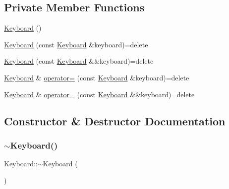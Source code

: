 \subsection*{Private Member Functions}
\begin{DoxyCompactItemize}
\item 
\mbox{\hyperlink{classsc_1_1_keyboard_ad6b0bb849d6bb7cdf63091e40b5f5f7f}{Keyboard}} ()
\item 
\mbox{\hyperlink{classsc_1_1_keyboard_a2916c770f969b5138536d6bb9fe61fa2}{Keyboard}} (const \mbox{\hyperlink{classsc_1_1_keyboard}{Keyboard}} \&keyboard)=delete
\item 
\mbox{\hyperlink{classsc_1_1_keyboard_a1cbcf356385e1c21756116c02fd561ae}{Keyboard}} (const \mbox{\hyperlink{classsc_1_1_keyboard}{Keyboard}} \&\&keyboard)=delete
\item 
\mbox{\hyperlink{classsc_1_1_keyboard}{Keyboard}} \& \mbox{\hyperlink{classsc_1_1_keyboard_ae1cb1f0536b084bdde85c610b14396ef}{operator=}} (const \mbox{\hyperlink{classsc_1_1_keyboard}{Keyboard}} \&keyboard)=delete
\item 
\mbox{\hyperlink{classsc_1_1_keyboard}{Keyboard}} \& \mbox{\hyperlink{classsc_1_1_keyboard_ab44b7b158694126e44b3576eb97b428f}{operator=}} (const \mbox{\hyperlink{classsc_1_1_keyboard}{Keyboard}} \&\&keyboard)=delete
\end{DoxyCompactItemize}


\subsection{Constructor \& Destructor Documentation}
\mbox{\label{classsc_1_1_keyboard_af6a99ec66c8c722a45b967bf79167038}} 
\subsubsection{\texorpdfstring{$\sim$Keyboard()}{~Keyboard()}}
{\footnotesize\ttfamily Keyboard\+::$\sim$\+Keyboard (\begin{DoxyParamCaption}{ }\end{DoxyParamCaption})}

\mbox{\label{classsc_1_1_keyboard_ad6b0bb849d6bb7cdf63091e40b5f5f7f}} 
